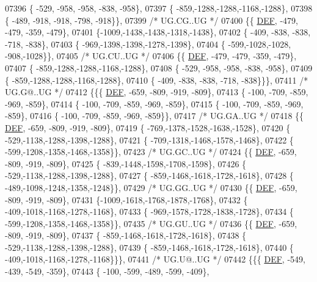 \begin{DoxyCode}
07396 \{ -529, -958, -958, -838, -958\},
07397 \{ -859,-1288,-1288,-1168,-1288\},
07398 \{ -489, -918, -918, -798, -918\}\},
07399 \textcolor{comment}{/* UG.CG..UG */}
07400 \{\{  \mbox{\hyperlink{1_88_84__epars_8h_a397419fc12b37ed479c8abb9d444d843}{DEF}}, -479, -479, -359, -479\},
07401 \{-1009,-1438,-1438,-1318,-1438\},
07402 \{ -409, -838, -838, -718, -838\},
07403 \{ -969,-1398,-1398,-1278,-1398\},
07404 \{ -599,-1028,-1028, -908,-1028\}\},
07405 \textcolor{comment}{/* UG.CU..UG */}
07406 \{\{  \mbox{\hyperlink{1_88_84__epars_8h_a397419fc12b37ed479c8abb9d444d843}{DEF}}, -479, -479, -359, -479\},
07407 \{ -859,-1288,-1288,-1168,-1288\},
07408 \{ -529, -958, -958, -838, -958\},
07409 \{ -859,-1288,-1288,-1168,-1288\},
07410 \{ -409, -838, -838, -718, -838\}\}\},
07411 \textcolor{comment}{/* UG.G@..UG */}
07412 \{\{\{  \mbox{\hyperlink{1_88_84__epars_8h_a397419fc12b37ed479c8abb9d444d843}{DEF}}, -659, -809, -919, -809\},
07413 \{ -100, -709, -859, -969, -859\},
07414 \{ -100, -709, -859, -969, -859\},
07415 \{ -100, -709, -859, -969, -859\},
07416 \{ -100, -709, -859, -969, -859\}\},
07417 \textcolor{comment}{/* UG.GA..UG */}
07418 \{\{  \mbox{\hyperlink{1_88_84__epars_8h_a397419fc12b37ed479c8abb9d444d843}{DEF}}, -659, -809, -919, -809\},
07419 \{ -769,-1378,-1528,-1638,-1528\},
07420 \{ -529,-1138,-1288,-1398,-1288\},
07421 \{ -709,-1318,-1468,-1578,-1468\},
07422 \{ -599,-1208,-1358,-1468,-1358\}\},
07423 \textcolor{comment}{/* UG.GC..UG */}
07424 \{\{  \mbox{\hyperlink{1_88_84__epars_8h_a397419fc12b37ed479c8abb9d444d843}{DEF}}, -659, -809, -919, -809\},
07425 \{ -839,-1448,-1598,-1708,-1598\},
07426 \{ -529,-1138,-1288,-1398,-1288\},
07427 \{ -859,-1468,-1618,-1728,-1618\},
07428 \{ -489,-1098,-1248,-1358,-1248\}\},
07429 \textcolor{comment}{/* UG.GG..UG */}
07430 \{\{  \mbox{\hyperlink{1_88_84__epars_8h_a397419fc12b37ed479c8abb9d444d843}{DEF}}, -659, -809, -919, -809\},
07431 \{-1009,-1618,-1768,-1878,-1768\},
07432 \{ -409,-1018,-1168,-1278,-1168\},
07433 \{ -969,-1578,-1728,-1838,-1728\},
07434 \{ -599,-1208,-1358,-1468,-1358\}\},
07435 \textcolor{comment}{/* UG.GU..UG */}
07436 \{\{  \mbox{\hyperlink{1_88_84__epars_8h_a397419fc12b37ed479c8abb9d444d843}{DEF}}, -659, -809, -919, -809\},
07437 \{ -859,-1468,-1618,-1728,-1618\},
07438 \{ -529,-1138,-1288,-1398,-1288\},
07439 \{ -859,-1468,-1618,-1728,-1618\},
07440 \{ -409,-1018,-1168,-1278,-1168\}\}\},
07441 \textcolor{comment}{/* UG.U@..UG */}
07442 \{\{\{  \mbox{\hyperlink{1_88_84__epars_8h_a397419fc12b37ed479c8abb9d444d843}{DEF}}, -549, -439, -549, -359\},
07443 \{ -100, -599, -489, -599, -409\},

\end{DoxyCode}
